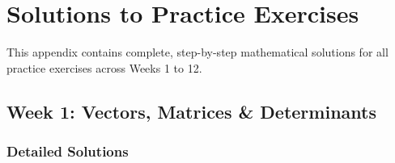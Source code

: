 \appendix
\chapter{Solutions to Practice Exercises}

This appendix contains complete, step-by-step mathematical solutions for all practice exercises across Weeks 1 to 12.

\section*{Week 1: Vectors, Matrices \& Determinants}

\subsection*{Detailed Solutions}

